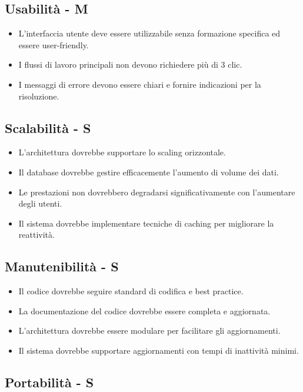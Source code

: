 \documentclass[12pt,a4paper,oneside]{report}
\begin{document}
\subsection{Usabilità  - M}

\begin{itemize}
    \item L'interfaccia utente deve essere utilizzabile senza formazione specifica ed essere user-friendly.
    \item I flussi di lavoro principali non devono richiedere più di 3 clic.
    \item I messaggi di errore devono essere chiari e fornire indicazioni per la risoluzione.
\end{itemize}

\subsection{Scalabilità - S}

\begin{itemize}
    \item  L'architettura dovrebbe supportare lo scaling orizzontale.
    \item Il database dovrebbe gestire efficacemente l'aumento di volume dei dati.
    \item Le prestazioni non dovrebbero degradarsi significativamente con l'aumentare degli utenti.
    \item Il sistema dovrebbe implementare tecniche di caching per migliorare la reattività.
\end{itemize}

\subsection{Manutenibilità - S}

\begin{itemize}
    \item Il codice dovrebbe seguire standard di codifica e best practice.
    \item La documentazione del codice dovrebbe essere completa e aggiornata.
    \item L'architettura dovrebbe essere modulare per facilitare gli aggiornamenti.
    \item Il sistema dovrebbe supportare aggiornamenti con tempi di inattività minimi.
\end{itemize}

\subsection{Portabilità - S}
\end{document}
